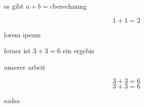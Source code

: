 


\label{0}


es gibt {$
a+b=c$}berechnung
\begin{myquote}
\item{} \begin{equation*}
1+1=2\end{equation*}
\end{myquote}

lorem ipsum 
\begin{myquote}
\item{} ferner ist {$
3+3=6$} ein ergebis
\end{myquote}

unserer arbeit
\begin{myquote}
\item{} \begin{equation*}
3+3=6\end{equation*}\begin{equation*}
3+3=6\end{equation*}
\end{myquote}

sadsa




